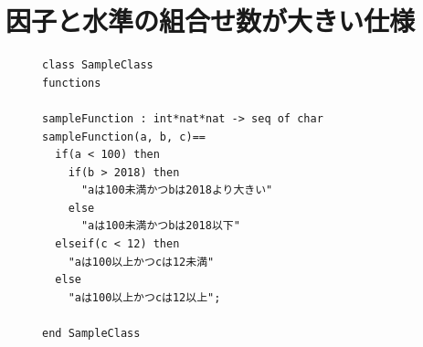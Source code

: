 \documentclass[uplatex, report, a4j, 10pt]{jsbook}
\begin{document}
\section{因子と水準の組合せ数が大きい仕様}

\lstset{language=}
\begin{figure}[tp]
  \begin{lstlisting}[caption={因子が3で水準が(6, 6, 6)の関数を持つVDM++仕様},label=fig:pict4javaSampleVdm]
class SampleClass
functions

sampleFunction : int*nat*nat -> seq of char
sampleFunction(a, b, c)==
  if(a < 100) then
    if(b > 2018) then
      "aは100未満かつbは2018より大きい"
    else
      "aは100未満かつbは2018以下"
  elseif(c < 12) then
    "aは100以上かつcは12未満"
  else
    "aは100以上かつcは12以上";

end SampleClass
\end{lstlisting}
\end{figure}
\end{document}
